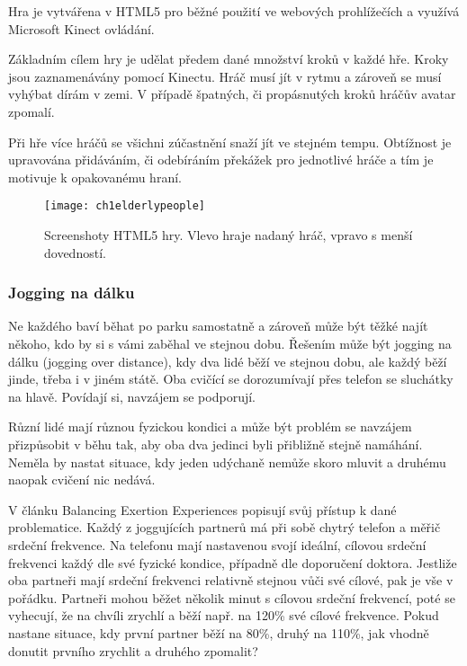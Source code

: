 Hra je vytvářena v HTML5 pro běžné použití ve webových prohlížečích a využívá Microsoft Kinect ovládání.

Základním cílem hry je udělat předem dané množství kroků v každé hře. Kroky jsou zaznamenávány pomocí Kinectu. Hráč musí jít v rytmu a zároveň se musí vyhýbat dírám v zemi. V případě špatných, či propásnutých kroků hráčův avatar zpomalí.

Při hře více hráčů se všichni zúčastnění snaží jít ve stejném tempu. Obtížnost je upravována přidáváním, či odebíráním překážek pro jednotlivé hráče a tím je motivuje k opakovanému hraní.

\begin{figure}
  \centering
  \texttt{[image: ch1elderlypeople]}
	\caption{Screenshoty HTML5 hry. Vlevo hraje nadaný hráč, vpravo s menší dovedností. \cite{8} }
	\label{ch1elderlypeople}
\end{figure}

\subsubsection{Jogging na dálku}

Ne každého baví běhat po parku samostatně a zároveň může být těžké najít někoho, kdo by si s vámi zaběhal ve stejnou dobu. Řešením může být jogging na dálku (jogging over distance), kdy dva lidé běží ve stejnou dobu, ale každý běží jinde, třeba i v jiném státě. Oba cvičící se dorozumívají přes telefon se sluchátky na hlavě. Povídají si, navzájem se podporují.

Různí lidé mají různou fyzickou kondici a může být problém se navzájem přizpůsobit v běhu tak, aby oba dva jedinci byli přibližně stejně namáhání. Neměla by nastat situace, kdy jeden udýchaně nemůže skoro mluvit a druhému naopak cvičení nic nedává.

V článku Balancing Exertion Experiences \cite{7} popisují svůj přístup k dané problematice. Každý z joggujících partnerů má při sobě chytrý telefon a měřič srdeční frekvence. Na telefonu mají nastavenou svojí ideální, cílovou srdeční frekvenci každý dle své fyzické kondice, případně dle doporučení doktora. Jestliže oba partneři mají srdeční frekvenci relativně stejnou vůči své cílové, pak je vše v pořádku. Partneři mohou běžet několik minut s cílovou srdeční frekvencí, poté se vyhecují, že na chvíli zrychlí a běží např. na 120\% své cílové frekvence. Pokud nastane situace, kdy první partner běží na 80\%, druhý na 110\%, jak vhodně donutit prvního zrychlit a druhého zpomalit? 

